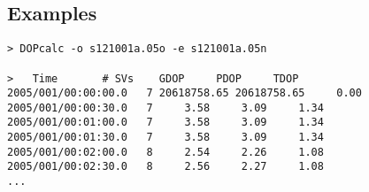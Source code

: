 \subsection{Examples}
\begin{verbatim}
> DOPcalc -o s121001a.05o -e s121001a.05n

>	Time	   # SVs    GDOP     PDOP     TDOP
2005/001/00:00:00.0   7 20618758.65 20618758.65     0.00
2005/001/00:00:30.0   7     3.58     3.09     1.34
2005/001/00:01:00.0   7     3.58     3.09     1.34
2005/001/00:01:30.0   7     3.58     3.09     1.34
2005/001/00:02:00.0   8     2.54     2.26     1.08
2005/001/00:02:30.0   8     2.56     2.27     1.08
...
\end{verbatim}

%

